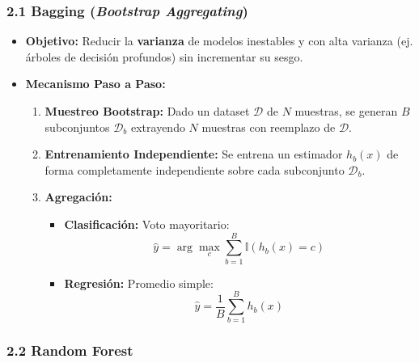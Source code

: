 \subsubsection{2.1 Bagging (\emph{Bootstrap Aggregating})}

\begin{itemize}
	\item \textbf{Objetivo:} Reducir la \textbf{varianza} de modelos inestables y con alta varianza (ej. árboles de decisión profundos) sin incrementar su sesgo.
	
	\item \textbf{Mecanismo Paso a Paso:}
	\begin{enumerate}
		\item \textbf{Muestreo Bootstrap:} Dado un dataset $\mathcal{D}$ de $N$ muestras, se generan $B$ subconjuntos $\mathcal{D}_b$ extrayendo $N$ muestras con reemplazo de $\mathcal{D}$.
		\item \textbf{Entrenamiento Independiente:} Se entrena un estimador $h_b(x)$ de forma completamente independiente sobre cada subconjunto $\mathcal{D}_b$.
		\item \textbf{Agregación:}
		\begin{itemize}
			\item \textbf{Clasificación:} Voto mayoritario:
			$$\hat{y} = \arg\max_{c} \sum_{b=1}^{B} \mathbb{I}(h_b(x) = c)$$
			\item \textbf{Regresión:} Promedio simple:
			$$\hat{y} = \frac{1}{B} \sum_{b=1}^{B} h_b(x)$$
		\end{itemize}
	\end{enumerate}
\end{itemize}

\subsubsection{2.2 Random Forest}

